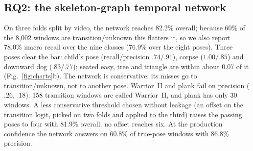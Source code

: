 \subsection{RQ2: the skeleton-graph temporal network}\label{sec:rq2}
On three folds split by video, the network reaches 82.2\% overall; because 60\% of the 8{,}002 windows are transition/unknown this flatters it, so we also report 78.0\% macro recall over the nine classes (76.9\% over the eight poses). Three poses clear the bar: child's pose (recall/precision $.74/.91$), corpse ($1.00/.85$) and downward dog ($.83/.77$); seated easy, tree and triangle are within about 0.07 of it (Fig.~\ref{fig:charts}b). The network is conservative: its misses go to transition/unknown, not to another pose. Warrior~II and plank fail on precision ($.26$, $.18$): 158 transition windows are called Warrior~II, and plank has only 30 windows. A less conservative threshold chosen without leakage (an offset on the transition logit, picked on two folds and applied to the third) raises the passing poses to four with 81.9\% overall; no offset reaches six. At the production confidence the network answers on 60.8\% of true-pose windows with 86.8\% precision.

